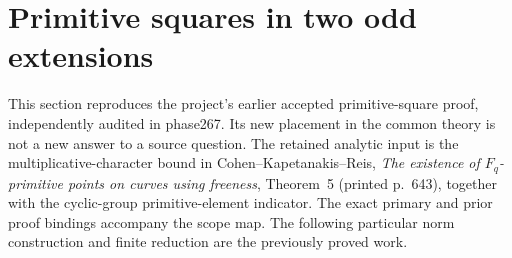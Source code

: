 \section{Primitive squares in two odd extensions}
This section reproduces the project's earlier accepted primitive-square
proof, independently audited in phase267. Its new placement in the
common theory is not a new answer to a source question. The retained
analytic input is the multiplicative-character bound in
Cohen--Kapetanakis--Reis, \emph{The existence of $F_q$-primitive points
on curves using freeness}, Theorem~5 (printed p.~643), together with
the cyclic-group primitive-element indicator. The exact primary and
prior proof bindings accompany the scope map. The following particular
norm construction and finite reduction are the previously proved work.

